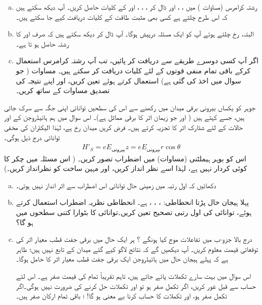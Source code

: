 \begin{enumerate}[a.]
\item
 رشتہ کرامرس (مساوات ) میں ، ،  اور  ڈال کر 
، ، ، اور 
 کے کلیات حاصل کریں۔ آپ دیکھ سکتے ہیں کہ اس طرح چلتے ہے کسی بھی مثبت طاقت کے کلیات دریافت کیے جا سکتے ہیں۔
\item
البتہ،  رخ چلتے ہوئے آپ کو ایک مسئلہ درپیش ہوگا۔ آپ  ڈال کر دیکھ سکتے ہیں کہ صرف  اور 
  کا رشتہ حاصل ہو تا ہے۔
\item
 اگر آپ کسی دوسرے طریقے سے  دریافت کر پائیں، تب آپ رشتہ کرامرس استعمال کرکے باقی تمام منفی قوتوں کے لئے کلیات دریافت کر سکتے ہیں۔
مساوات  ( جو سوال  میں اخذ کی گئی ہے) استعمال کرتے ہوئے 
تعین کریں، اور اپنے نتیجہ کی تصدیق مساوات  کے ساتھ کریں۔
\end{enumerate}
 جوہر کو یکساں بیرونی برقی میدان  میں رکھنے سے اس کی سطحیں توانائی اپنی جگہ سے سرک جاتی ہیں، جسے  کہتے ہیں ( اور جو زیمان اثر کا برقی مماثل ہے)۔ اس سوال میں ہم ہائیڈروجن کے  اور  حالات کے لئے شٹارک اثر کا تجزیہ کرتے ہیں۔ فرض کریں میدان  رخ ہے، لہٰذا الیکٹران کی مخفی توانائی درج ذیل ہوگی۔
\begin{align*}
H'_{S}=eE_{\text{بیرونی}}z=eE_{\text{بیرونی}}r\cos{\theta}
\end{align*}
اس کو بوہر ہیملٹنی (مساوات) میں اضطراب تصور کریں۔ ( اس مسئلہ میں چکر کا کوئی کردار نہیں ہے، لہٰذا اسے نظر انداز کریں، اور مہین ساخت کو نظرانداز کریں۔)
\begin{enumerate}[a.]
\item
 دکھائیں کہ اول رتبہ میں زمینی حال توانائی اس اضطراب سے اثر انداز نہیں ہوتی۔
\item
پہلا ہیجان حال  پڑتا انحطاطی: ، ، ،  ہے۔ انحطاطی نظریہ اضطراب استعمال کرتے ہوئے، توانائی کی اول رتبی تصحیح تعین کریں۔توانائی  کا بٹوارا کتنی سطحوں میں ہو گا؟
\item
 درج بالا جزو-ب میں  تفاعلات موج کیا ہونگے ؟ ہر ایک  حال میں برقی جفت قطب معیار اثر  کی توقعاتی قیمت معلوم کریں۔ آپ دیکھیں گے کہ نتائج لاگو کیے گئے میدان کے تابع نہیں ہیں؛ ظاہر ہے کہ پہلے ہیجان حال میں ہائیڈروجن ایک  برقی جفت قطب معیار اثر کا حامل ہوگا۔
 
  اس سوال میں بہت سارے تکملات پائے جاتے ہیں، تاہم تقریباً تمام کی قیمت صفر ہے۔ اس لئے حساب سے قبل غور کریں، اگر  تکمل صفر ہو تو  اور  تکملات حل کرنے کی ضرورت نہیں ہوگی۔اگر  تکمل صفر ہو،  اور  تکملات کا حساب کرنا بے معنی ہو گا!  ؛ باقی تمام ارکان صفر ہیں۔ 
\end{enumerate}
